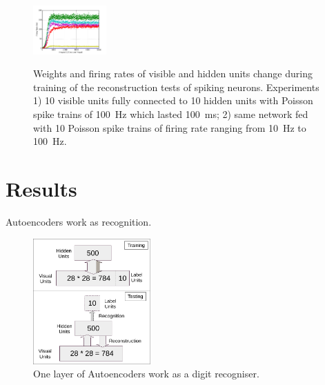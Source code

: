 \documentclass{article}
\begin{document}
\begin{figure}
{		\centering
		\includegraphics[width=0.25\textwidth]{exp1_hid_s_decay}
	}
	\\
	\caption{Weights and firing rates of visible and hidden units change during training of the reconstruction tests of spiking neurons. 
		Experiments 1) 10 visible units fully connected to 10 hidden units with Poisson spike trains of 100~Hz which lasted 100~ms; 2) same network fed with 10 Poisson spike trains of firing rate ranging from 10~Hz to 100~Hz.}
\end{figure}
\section{Results}
Autoencoders work as recognition.
\begin{figure}
	\centering
	\includegraphics[width=0.4\textwidth]{mnist}
	\caption{One layer of Autoencoders work as a digit recogniser.}
	\label{fig:mnist}		
\end{figure}
\end{document}
